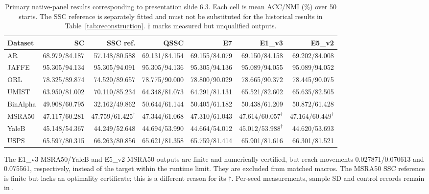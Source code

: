 {\begin{table}[!htbp]
\centering
\caption{Primary native-panel results corresponding to presentation slide 6.3.
Each cell is mean ACC/NMI (\%) over 50 starts. The SSC reference is separately
fitted and must not be substituted for the historical results in
Table~\ref{tab:reconstruction}. $\dagger$ marks measured but unqualified outputs.}
\label{tab:extension_eight}
\footnotesize
\setlength{\tabcolsep}{2.5pt}
\begin{tabular}{@{}lrrrrrr@{}}
\toprule
Dataset & SC & SSC ref. & QSSC & E7 & E1\_v3 & E5\_v2 \\
\midrule
AR
 & 68.979/84.187 & 57.148/80.588 & 69.131/84.154
 & 69.155/84.079 & 69.150/84.158 & 69.202/84.008 \\
JAFFE
 & 95.305/94.134 & 95.305/94.091 & 95.305/94.136
 & 95.305/94.136 & 95.089/94.055 & 95.089/94.052 \\
ORL
 & 78.325/89.874 & 74.520/89.657 & 78.775/90.000
 & 78.800/90.029 & 78.665/90.372 & 78.445/90.075 \\
UMIST
 & 63.950/81.002 & 70.110/85.234 & 64.348/81.073
 & 64.291/81.131 & 65.521/82.602 & 65.635/82.505 \\
BinAlpha
 & 49.908/60.795 & 32.162/49.862 & 50.644/61.144
 & 50.405/61.182 & 50.438/61.209 & 50.872/61.428 \\
MSRA50
 & 47.117/60.281 & $47.759/61.425^{\dagger}$ & 47.344/61.068
 & 47.310/61.043 & $47.614/60.057^{\dagger}$
 & $47.164/60.449^{\dagger}$ \\
YaleB
 & 45.148/54.367 & 44.249/52.648 & 44.694/53.990
 & 44.664/54.012 & $45.012/53.988^{\dagger}$ & 44.620/53.693 \\
USPS
 & 65.597/80.315 & 66.263/80.856 & 65.621/81.358
 & 65.759/81.414 & 65.901/81.616 & 66.301/81.521 \\
\bottomrule
\end{tabular}
\end{table}

The E1\_v3 MSRA50/YaleB and E5\_v2 MSRA50 outputs are finite and numerically
certified, but reach movements 0.027871/0.070613 and 0.075561, respectively,
instead of the target within the runtime limit. They are excluded from matched
macros. The MSRA50 SSC reference is finite but lacks an optimality certificate;
this is a different reason for its $\dagger$. Per-seed measurements, sample SD
and control records remain in
.

}
